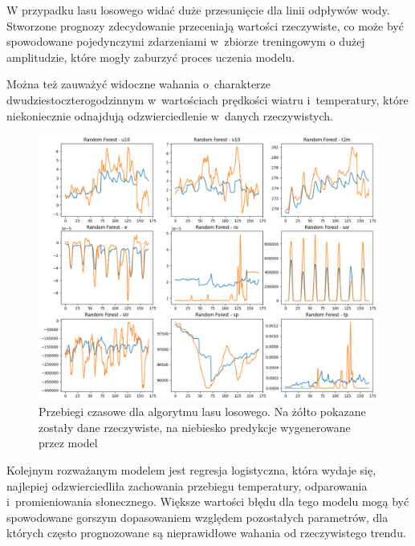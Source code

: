 W przypadku lasu losowego widać duże przesunięcie dla linii odpływów wody. Stworzone prognozy zdecydowanie
przeceniają wartości rzeczywiste, co może być spowodowane pojedynczymi zdarzeniami w~zbiorze treningowym o
dużej amplitudzie, które mogły zaburzyć proces uczenia modelu.

Można też zauważyć widoczne wahania o~charakterze dwudziestoczterogodzinnym w~wartościach 
prędkości wiatru i~temperatury, które niekoniecznie odnajdują odzwierciedlenie w~danych rzeczywistych.

\begin{figure}[H]
    \centering
    \includegraphics[width=\textwidth]{images/random_forest_week.png}
    \caption[Przebiegi czasowe dla lasu losowego]{Przebiegi czasowe dla algorytmu lasu losowego. Na żółto pokazane zostały dane 
    rzeczywiste, na niebiesko predykcje wygenerowane przez model}
    \label{forest-week}
\end{figure}

Kolejnym rozważanym modelem jest regresja logistyczna, która wydaje się, najlepiej odzwierciedliła 
zachowania przebiegu temperatury, odparowania i~promieniowania słonecznego. Większe wartości 
błędu dla tego modelu mogą być spowodowane gorszym dopasowaniem względem pozostałych parametrów, dla których
często prognozowane są nieprawidłowe wahania od rzeczywistego trendu.

